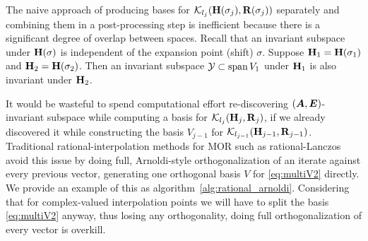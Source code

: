 The naive approach of producing bases for $\mathcal{K}_{l_j}({\textbf{\textup{H}}(\sigma_j)},{\textbf{\textup{R}}(\sigma_j)})$ separately and combining them in a post-processing step is inefficient because there is a significant degree of overlap between spaces.    Recall that an invariant subspace under $\textbf{\textup{H}}(\sigma)$ is independent of the expansion point (shift) $\sigma$.  Suppose $\textbf{\textup{H}}_1 = \textbf{\textup{H}}(\sigma_1)$  and $\textbf{\textup{H}}_2=\textbf{\textup{H}}(\sigma_2)$.  Then an invariant subspace $\mathcal{Y}\subset \operatorname*{span} V_1$ under $\textbf{\textup{H}}_1$ is also invariant under $\textbf{\textup{H}}_2$.
 
 It would be wasteful to spend computational effort re-discovering $(\bm{A},\bm{E})$-invariant subspace while computing a basis for $\mathcal{K}_{l_j}({\textbf{\textup{H}}_j},{\textbf{\textup{R}}_j})$, if we already discovered it while constructing the basis $V_{j-1}$ for  $\mathcal{K}_{l_{j-1}}({\textbf{\textup{H}}_{j-1}},{\textbf{\textup{R}}_{j-1}})$. Traditional rational-interpolation methods for MOR such as rational-Lanczos \cite{gallivan1996rational} avoid this issue by doing full, Arnoldi-style orthogonalization of an iterate against every previous vector, generating one orthogonal basis $V$ for \eqref{eq:multiV2} directly.  We provide  an example of this as algorithm~\ref{alg:rational_arnoldi}.  Considering that for complex-valued interpolation points we will have to split the basis \eqref{eq:multiV2} anyway, thus losing any orthogonality, doing full orthogonalization of every vector is overkill.   


